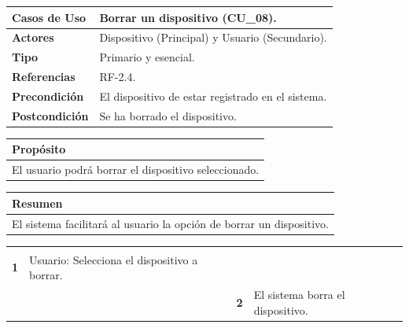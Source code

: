 \begin{itemize}
    \begin{table}[h!]
        \centering
        \begin{tabular}{|l|p{}|}
            \hline
            \textbf{Casos de Uso}   &   Borrar un dispositivo (CU\_08). \\
            \hline 
            \textbf{Actores}        &   Dispositivo (Principal) y Usuario (Secundario). \\ 
            \hline 
            \textbf{Tipo}           &   Primario y esencial. \\ 
            \hline
            \textbf{Referencias}    &   RF-2.4.\\ 
            \hline
            \textbf{Precondición}   &   El dispositivo de estar registrado en el sistema. \\ 
            \hline
            \textbf{Postcondición}  &   Se ha borrado el dispositivo. \\ 
            \hline
        \end{tabular}
        
        \vspace{5mm}
        
        \begin{tabular}{|p{\textwidth}|}
            \hline
            \rowcolor{SeaGreen} \textbf{Propósito} \\
            \hline
            \multicolumn{1}{|p{12cm}|}{El usuario podrá borrar el dispositivo seleccionado. } \\ [0.5ex]
            \hline
        \end{tabular}
        
        \vspace{5mm}
        
        \begin{tabular}{|p{\textwidth}|}
            \hline
            \rowcolor{SeaGreen} \textbf{Resumen} \\
            \hline
            \multicolumn{1}{|p{12cm}|}{El sistema facilitará al usuario la opción de borrar un dispositivo.} \\ [0.5ex]
            \hline
        \end{tabular}
        
        \vspace{5mm}
        
        \begin{tabular}{|p{}|p{}|p{}|p{}|}
            \cline{1-4}
            \rowcolor{SeaGreen} \multicolumn{4}{|l|}{\textbf{Curso Normal}} \\
            \cline{1-4}
            \textbf{1} & Usuario: Selecciona el dispositivo a borrar. &  &  \\
            \hline
             & & \textbf{2} & El sistema borra el dispositivo. \\
            \hline
        \end{tabular}
        

\end{table}
\end{itemize}
